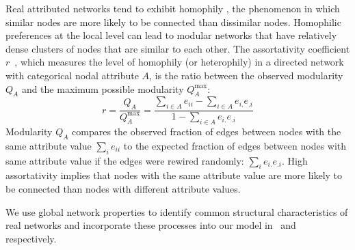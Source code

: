 Real attributed networks tend to exhibit homophily
\cite{mcpherson2001birds}, the phenomenon in which similar nodes are more likely
to be connected than dissimilar nodes. Homophilic preferences at the local level
can lead to modular networks that have relatively dense clusters of nodes that are similar
to each other. The assortativity coefficient $r$~\cite{newman2002assortative},
which measures the level of homophily (or heterophily) in a directed network with
categorical nodal attribute $A$, is the ratio between the
observed modularity $Q_A$ and the maximum possible modularity $Q^{\max}_A$:
$$ r = \frac{Q_A}{Q^{\max}_A} = \frac{\sum\limits_{i \in A} e_{ii} - \sum\limits_{i \in A} e_{i.}e_{.i}}{1 - \sum\limits_{i \in A} e_{i.}e_{.i}} $$
Modularity $Q_A$ compares the observed fraction of edges between nodes with the same attribute
value $\sum_i e_{ii}$ to the expected fraction of edges between nodes with same
attribute value if the edges were rewired randomly:  $\sum_i e_{i.}e_{.i}$.
High assortativity implies that nodes with the same
attribute value are more likely to be connected than nodes with different attribute values.

We use global network properties to identify common structural
characteristics of real networks and incorporate these processes into our model
in~ and~ respectively.
